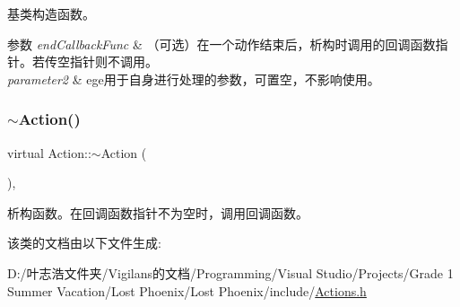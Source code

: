 基类构造函数。 


\begin{DoxyParams}{参数}
{\em end\+Callback\+Func} & （可选）在一个动作结束后，析构时调用的回调函数指针。若传空指针则不调用。\\
\hline
{\em parameter2} & ege用于自身进行处理的参数，可置空，不影响使用。 \\
\hline
\end{DoxyParams}
\mbox{\label{class_action_abcf4c6358f53a666631ace11b325a7cd}} 
\subsubsection{\texorpdfstring{$\sim$\+Action()}{~Action()}}
{\footnotesize\ttfamily virtual Action\+::$\sim$\+Action (\begin{DoxyParamCaption}{ }\end{DoxyParamCaption})\hspace{0.3cm}{\ttfamily [inline]}, {\ttfamily [virtual]}}



析构函数。在回调函数指针不为空时，调用回调函数。 



该类的文档由以下文件生成\+:\begin{DoxyCompactItemize}
\item 
D\+:/叶志浩文件夹/\+Vigilans的文档/\+Programming/\+Visual Studio/\+Projects/\+Grade 1 Summer Vacation/\+Lost Phoenix/\+Lost Phoenix/include/\hyperlink{_actions_8h}{Actions.\+h}\end{DoxyCompactItemize}
